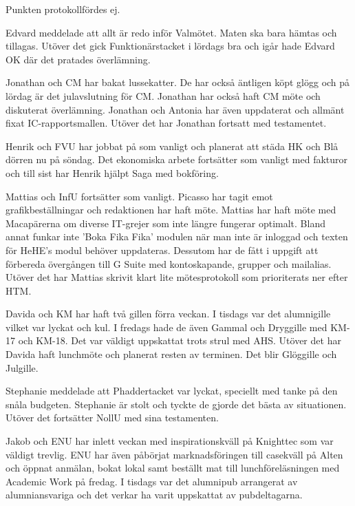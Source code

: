 \documentclass[10pt]{article}
\begin{document}
\begin{paragrafer}
\begin{paragrafer}


Punkten protokollfördes ej.


Edvard meddelade att allt är redo inför Valmötet. Maten ska bara hämtas och tillagas. Utöver det gick Funktionärstacket i lördags bra och igår hade Edvard OK där det pratades överlämning.

Jonathan och CM har bakat lussekatter. De har också äntligen köpt glögg och på lördag är det julavslutning för CM. 
Jonathan har också haft CM möte och diskuterat överlämning. Jonathan och Antonia har även uppdaterat och allmänt fixat IC-rapportsmallen. Utöver det har Jonathan fortsatt med testamentet. 

Henrik och FVU har jobbat på som vanligt och planerat att städa HK och Blå dörren nu på söndag. Det ekonomiska arbete fortsätter som vanligt med fakturor och till sist har Henrik hjälpt Saga med bokföring. 

Mattias och InfU fortsätter som vanligt. Picasso har tagit emot grafikbeställningar och redaktionen har haft möte. 
Mattias har haft möte med Macapärerna om diverse IT-grejer som inte längre fungerar optimalt. Bland annat funkar inte 'Boka Fika Fika' modulen när man inte är inloggad och texten för HeHE's modul behöver uppdateras. Dessutom har de fått i uppgift att förbereda övergången till G Suite med kontoskapande, grupper och mailalias. 
Utöver det har Mattias skrivit klart lite mötesprotokoll som prioriterats ner efter HTM. 

Davida och KM har haft två gillen förra veckan. I tisdags var det alumnigille vilket var lyckat och kul. I fredags hade de även Gammal och Dryggille med KM-17 och KM-18. Det var väldigt uppskattat trots strul med AHS. Utöver det har Davida haft lunchmöte och planerat resten av terminen. Det blir Glöggille och Julgille.

Stephanie meddelade att Phaddertacket var lyckat, speciellt med tanke på den snåla budgeten. Stephanie är stolt och tyckte de gjorde det bästa av situationen. Utöver det fortsätter NollU med sina testamenten. 

Jakob och ENU har inlett veckan med inspirationskväll på Knighttec som var väldigt trevlig. ENU har även påbörjat marknadsföringen till casekväll på Alten och öppnat anmälan, bokat lokal samt beställt mat till lunchföreläsningen med Academic Work på fredag. I tisdags var det alumnipub arrangerat av alumniansvariga och det verkar ha varit uppskattat av pubdeltagarna. 


\end{paragrafer}
\end{paragrafer}
\end{document}
